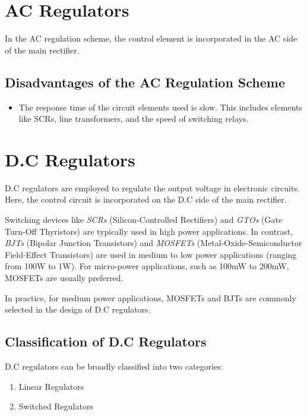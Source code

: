 \documentclass[a4paper,9pt,twoside,openany,twocolumn]{memoir}
\begin{document}
\section{AC Regulators}
In the AC regulation scheme, the control element is incorporated in the AC side of the main rectifier.

\subsection{Disadvantages of the AC Regulation Scheme}
\begin{itemize}
    \item The response time of the circuit elements used is slow. This includes elements like SCRs, line transformers, and the speed of switching relays.
\end{itemize}

\section{D.C Regulators}

D.C regulators are employed to regulate the output voltage in electronic circuits. Here, the control circuit is incorporated on the D.C side of the main rectifier.

Switching devices like \textit{SCRs} (Silicon-Controlled Rectifiers) and \textit{GTOs} (Gate Turn-Off Thyristors) are typically used in high power applications. In contrast, \textit{BJTs} (Bipolar Junction Transistors) and \textit{MOSFETs} (Metal-Oxide-Semiconductor Field-Effect Transistors) are used in medium to low power applications (ranging from 100W to 1W). For micro-power applications, such as 100mW to 200mW, MOSFETs are usually preferred.

In practice, for medium power applications, MOSFETs and BJTs are commonly selected in the design of D.C regulators.

\subsection{Classification of D.C Regulators}

D.C regulators can be broadly classified into two categories:

\begin{enumerate}
    \item Linear Regulators
    \item Switched Regulators
\end{enumerate}
\end{document}
